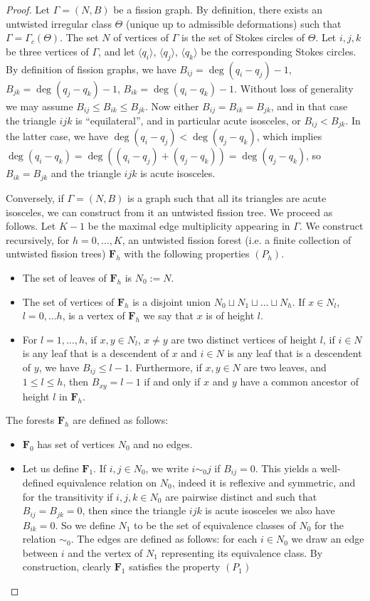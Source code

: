 \documentclass[11pt,a4paper]{amsart}
\numberwithin{equation}{section}
\begin{document}
\begin{proof}
Let $\Gamma=(N, B)$ be a fission graph. By definition, there exists an untwisted irregular class $\Theta$ (unique up to admissible deformations) such that $\Gamma=\Gamma_c(\Theta)$. The set $N$  of vertices of $\Gamma$ is the set of Stokes circles of $\Theta$. 
Let $i, j, k$ be three vertices of $\Gamma$, and let $\langle q_i\rangle$, $\langle q_j \rangle$, $\langle q_k \rangle$ be the corresponding Stokes circles. By definition of fission graphs, we have $B_{ij}=\deg(q_i-q_j)-1$, $B_{jk}=\deg(q_j-q_k)-1$, $B_{ik}=\deg(q_i-q_k)-1$. Without loss of generality we may assume $B_{ij}\leq B_{ik}\leq B_{jk}$. Now either $B_{ij}=B_{ik}=B_{jk}$, and in that case the triangle $ijk$ is ``equilateral'', and in particular acute isosceles, or $B_{ij}<B_{jk}$. In the latter case, we have $\deg(q_i-q_j)<\deg(q_j-q_k)$, which implies $\deg(q_i-q_k)=\deg((q_i-q_j)+(q_j-q_k))=\deg(q_j-q_k)$, so $B_{ik}=B_{jk}$ and the triangle $ijk$ is acute isosceles. 


Conversely, if $\Gamma=(N, B)$ is a graph such that all its triangles are acute isosceles, we can construct from it an untwisted fission tree. We proceed as follows.  Let $K-1$ be the maximal edge multiplicity appearing in $\Gamma$. We construct recursively, for $h=0, \dots, K$, an untwisted fission forest (i.e. a finite collection of untwisted fission trees) $\mathbf F_h$ with the following properties $(P_h)$. 
\begin{itemize}
\item The set of leaves of $\mathbf F_h$ is $N_0:=N$. 
\item The set of vertices of $\mathbf F_h$ is a disjoint union $N_0\sqcup N_1 \sqcup \dots \sqcup N_h$. If $x\in N_l$, $l=0, \dots h$, is a vertex of $\mathbf F_h$ we say that $x$ is of height $l$. 
\item For $l=1,\dots, h$, if $x, y\in N_l$, $x\neq y$ are two distinct vertices of height $l$, if $i\in N$ is any leaf that is a descendent of $x$ and $i\in N$ is any leaf that is a descendent of $y$, we have $B_{ij}\leq l-1$. Furthermore, if $x,y\in N$ are two leaves, and $1\leq l\leq h$, then $B_{xy}=l-1$ if and only if $x$ and $y$ have a common ancestor of height $l$ in $\mathbf F_h$. 
\end{itemize}
The forests $\mathbf F_h$ are defined as follows:


\begin{itemize}
\item $\mathbf F_0$ has set of vertices $N_0$ and no edges. 
\item Let us define $\mathbf F_1$. If $i,j\in N_0$, we write $i\sim_0 j$ if $B_{ij}=0$. This yields a well-defined equivalence relation on $N_0$, indeed it is reflexive and symmetric, and for the transitivity if $i, j,k\in N_0$ are pairwise distinct and such that $B_{ij}=B_{jk}=0$, then since the triangle $ijk$ is acute isosceles we also have $B_{ik}=0$. So we define $N_1$ to be the set of equivalence classes of $N_0$ for the relation $\sim_0$. The edges are defined as follows: for each $i\in N_0$ we draw an edge between $i$ and the vertex of $N_1$ representing its equivalence class. By construction, clearly $\mathbf F_1$ satisfies the property $(P_1)$


\end{itemize}
\end{proof}
\end{document}
